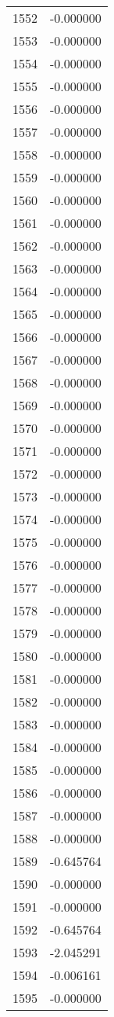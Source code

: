 \documentclass[12pt]{article}
\begin{document}
\begin{longtable}{@{}cc@{}}
1552 & -0.000000 \\
1553 & -0.000000 \\
1554 & -0.000000 \\
1555 & -0.000000 \\
1556 & -0.000000 \\
1557 & -0.000000 \\
1558 & -0.000000 \\
1559 & -0.000000 \\
1560 & -0.000000 \\
1561 & -0.000000 \\
1562 & -0.000000 \\
1563 & -0.000000 \\
1564 & -0.000000 \\
1565 & -0.000000 \\
1566 & -0.000000 \\
1567 & -0.000000 \\
1568 & -0.000000 \\
1569 & -0.000000 \\
1570 & -0.000000 \\
1571 & -0.000000 \\
1572 & -0.000000 \\
1573 & -0.000000 \\
1574 & -0.000000 \\
1575 & -0.000000 \\
1576 & -0.000000 \\
1577 & -0.000000 \\
1578 & -0.000000 \\
1579 & -0.000000 \\
1580 & -0.000000 \\
1581 & -0.000000 \\
1582 & -0.000000 \\
1583 & -0.000000 \\
1584 & -0.000000 \\
1585 & -0.000000 \\
1586 & -0.000000 \\
1587 & -0.000000 \\
1588 & -0.000000 \\
1589 & -0.645764 \\
1590 & -0.000000 \\
1591 & -0.000000 \\
1592 & -0.645764 \\
1593 & -2.045291 \\
1594 & -0.006161 \\
1595 & -0.000000 \\

\end{longtable}
\end{document}

